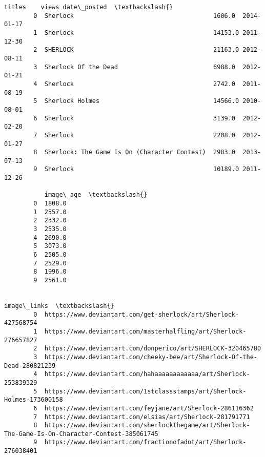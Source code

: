 \documentclass[11pt]{article}
\begin{document}
\begin{Verbatim}[commandchars=\\\{\}]
                                                 titles    views date\_posted  \textbackslash{}
        0  Sherlock                                      1606.0  2014-01-17    
        1  Sherlock                                      14153.0 2011-12-30    
        2  SHERLOCK                                      21163.0 2012-08-11    
        3  Sherlock Of the Dead                          6988.0  2012-01-21    
        4  Sherlock                                      2742.0  2011-08-19    
        5  Sherlock Holmes                               14566.0 2010-08-01    
        6  Sherlock                                      3139.0  2012-02-20    
        7  Sherlock                                      2208.0  2012-01-27    
        8  Sherlock: The Game Is On (Character Contest)  2983.0  2013-07-13    
        9  Sherlock                                      10189.0 2011-12-26    
        
           image\_age  \textbackslash{}
        0  1808.0      
        1  2557.0      
        2  2332.0      
        3  2535.0      
        4  2690.0      
        5  3073.0      
        6  2505.0      
        7  2529.0      
        8  1996.0      
        9  2561.0      
        
                                                                                                  image\_links  \textbackslash{}
        0  https://www.deviantart.com/get-sherlock/art/Sherlock-427568754                                       
        1  https://www.deviantart.com/masterhalfling/art/Sherlock-276657827                                     
        2  https://www.deviantart.com/donperico/art/SHERLOCK-320465780                                          
        3  https://www.deviantart.com/cheeky-bee/art/Sherlock-Of-the-Dead-280821239                             
        4  https://www.deviantart.com/hahaaaaaaaaaaaa/art/Sherlock-253839329                                    
        5  https://www.deviantart.com/1stclassstamps/art/Sherlock-Holmes-173600158                              
        6  https://www.deviantart.com/feyjane/art/Sherlock-286116362                                            
        7  https://www.deviantart.com/elsias/art/Sherlock-281791771                                             
        8  https://www.deviantart.com/sherlockthegame/art/Sherlock-The-Game-Is-On-Character-Contest-385061745   
        9  https://www.deviantart.com/fractionofadot/art/Sherlock-276038401                                     
        

\end{Verbatim}
\end{document}
